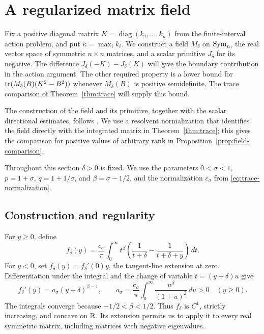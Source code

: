 \section{A regularized matrix field}\label{sec:field}

Fix a positive diagonal matrix $K=\operatorname{diag}(k_1,\ldots,k_n)$
from the finite-interval action problem, and put
$\kappa=\max_i k_i$.  We construct a field $M_\delta$ on $\operatorname{Sym}_n$,
the real vector space of symmetric $n\times n$ matrices, and a scalar
primitive $J_\delta$ for its negative.  The difference
$J_\delta(-K)-J_\delta(K)$ will give the boundary contribution in the
action argument.  The other required property is a lower bound for
$\operatorname{tr}(M_\delta(B)(K^2-B^2))$ whenever $M_\delta(B)$ is positive
semidefinite.  The trace comparison of Theorem~\ref{thm:trace} will
supply this bound.

The construction of the field and its primitive, together with the scalar
directional estimates, follows \cite[Section~3]{ScalarCompanion}.  We use a resolvent
normalization that identifies the field directly with the integrated
matrix in Theorem~\ref{thm:trace}; this gives the comparison for positive
values of arbitrary rank in Proposition~\ref{prop:field-comparison}.

Throughout this section $\delta>0$ is fixed.  We use the parameters
$0<\sigma<1$, $p=1+\sigma$, $q=1+1/\sigma$, and
$\beta=\sigma-1/2$, and the normalization $c_\sigma$ from
\eqref{eq:trace-normalization}.

\subsection{Construction and regularity}

For $y\geq0$, define
\begin{equation}\label{eq:field-f}
 f_\delta(y)=\frac{c_\sigma}{\pi}\int_0^\infty t^\beta
 \left(\frac1{t+\delta}-\frac1{t+\delta+y}\right)\,dt.
\end{equation}
For $y<0$, set $f_\delta(y)=f_\delta'(0)y$, the tangent-line
extension at zero.  Differentiation under the integral and the change
of variable $t=(y+\delta)u$ give
\begin{equation}\label{eq:field-f-derivative}
 f_\delta'(y)=a_\sigma(y+\delta)^{\beta-1},\qquad
 a_\sigma=\frac{c_\sigma}{\pi}
       \int_0^\infty\frac{u^\beta}{(1+u)^2}\,du>0
       \quad (y\geq0).
\end{equation}
The integrals converge because $-1/2<\beta<1/2$.
Thus $f_\delta$ is $C^1$, strictly increasing, and concave on $\mathbb R$.
Its extension permits us to apply it to every real symmetric matrix,
including matrices with negative eigenvalues.

